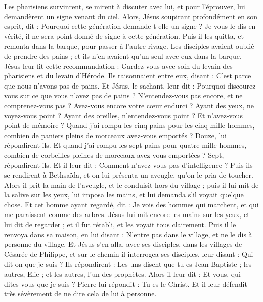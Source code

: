 \begin{multicols}{2}
Les pharisiens survinrent, se mirent à discuter avec lui, et pour l'éprouver, lui demandèrent un signe venant du ciel.
Alors, Jésus soupirant profondément en son esprit, dit : Pourquoi cette génération demande-t-elle un signe ? Je vous le dis en vérité, il ne sera point donné de signe à cette génération.
Puis il les quitta, et remonta dans la barque, pour passer à l'autre rivage.
Les disciples avaient oublié de prendre des pains ; et ils n'en avaient qu'un seul avec eux dans la barque.
Jésus leur fit cette recommandation : Gardez-vous avec soin du levain des pharisiens et du levain d'Hérode.
Ils raisonnaient entre eux, disant : C'est parce que nous n'avons pas de pains.
Et Jésus, le sachant, leur dit : Pourquoi discourez-vous sur ce que vous n'avez pas de pains ? N’entendez-vous pas encore, et ne comprenez-vous pas ?
Avez-vous encore votre cœur endurci ? Ayant des yeux, ne voyez-vous point ? Ayant des oreilles, n'entendez-vous point ? Et n'avez-vous point de mémoire ?
Quand j’ai rompu les cinq pains pour les cinq mille hommes, combien de paniers pleins de morceaux avez-vous emportés ? Douze, lui répondirent-ils.
Et quand j’ai rompu les sept pains pour quatre mille hommes, combien de corbeilles pleines de morceaux avez-vous emportées ? Sept, répondirent-ils.
Et il leur dit : Comment n'avez-vous pas d'intelligence ?
Puis ils se rendirent à Bethsaïda, et on lui présenta un aveugle, qu’on le pria de toucher.
Alors il prit la main de l'aveugle, et le conduisit hors du village ; puis il lui mit de la salive sur les yeux, lui imposa les mains, et lui demanda s'il voyait quelque chose.
Et cet homme ayant regardé, dit : Je vois des hommes qui marchent, et qui me paraissent comme des arbres.
Jésus lui mit encore les mains sur les yeux, et lui dit de regarder ; et il fut rétabli, et les voyait tous clairement.
Puis il le renvoya dans sa maison, en lui disant : N'entre pas dans le village, et ne le dis à personne du village.
Et Jésus s’en alla, avec ses disciples, dans les villages de Césarée de Philippe, et sur le chemin il interrogea ses disciples, leur disant : Qui dit-on que je suis ?
Ils répondirent : Les uns disent que tu es Jean-Baptiste ; les autres, Elie ; et les autres, l'un des prophètes.
Alors il leur dit : Et vous, qui dites-vous que je suis ? Pierre lui répondit : Tu es le Christ.
Et il leur défendit très sévèrement de ne dire cela de lui à personne.

\end{multicols}
